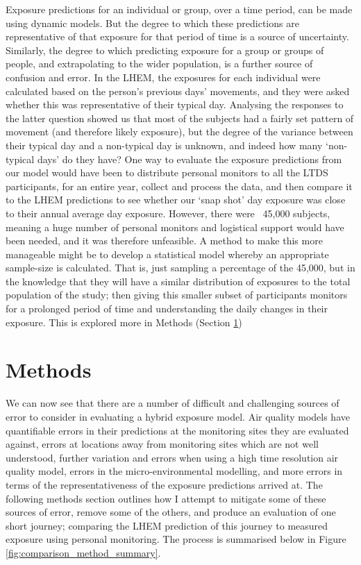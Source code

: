 Exposure predictions for an individual or group, over a time period, can be made using dynamic models. But the degree to which these predictions are representative of that exposure for that period of time is a source of uncertainty. Similarly, the degree to which predicting exposure for a group or groups of people, and extrapolating to the wider population, is a further source of confusion and error. In the LHEM, the exposures for each individual were calculated based on the person’s previous days’ movements, and they were asked whether this was representative of their typical day. Analysing the responses to the latter question showed us that most of the subjects had a fairly set pattern of movement (and therefore likely exposure), but the degree of the variance between their typical day and a non-typical day is unknown, and indeed how many ‘non-typical days’ do they have? One way to evaluate the exposure predictions from our model would have been to distribute personal monitors to all the LTDS participants, for an entire year, collect and process the data, and then compare it to the LHEM predictions to see whether our ‘snap shot’ day exposure was close to their annual average day exposure. However, there were ~45,000 subjects, meaning a huge number of personal monitors and logistical support would have been needed, and it was therefore unfeasible. A method to make this more manageable might be to develop a statistical model whereby an appropriate sample-size is calculated. That is, just sampling a percentage of the 45,000, but in the knowledge that they will have a similar distribution of exposures to the total population of the study; then giving this smaller subset of participants monitors for a prolonged period of time and understanding the daily changes in their exposure. This is explored more in Methods (Section \ref{sec:4methods}) 

\section{Methods}
\label{sec:4methods}

We can now see that there are a number of difficult and challenging sources of error to consider in evaluating a hybrid exposure model. Air quality models have quantifiable errors in their predictions at the monitoring sites they are evaluated against, errors at locations away from monitoring sites which are not well understood, further variation and errors when using a high time resolution air quality model, errors in the micro-environmental modelling, and more errors in terms of the representativeness of the exposure predictions arrived at. The following methods section outlines how I attempt to mitigate some of these sources of error, remove some of the others, and produce an evaluation of one short journey; comparing the LHEM prediction of this journey to measured exposure using personal monitoring. The process is summarised below in Figure \ref{fig:comparison_method_summary}.

